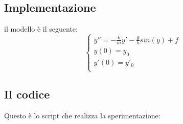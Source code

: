 \documentclass{article}
\begin{document}
	\subsection{Implementazione}
	il modello è il seguente:
	\begin{equation}
	\begin{cases}
	y''=-\frac{k}{m}y'-\frac{g}{h}sin(y)+f \\
	y(0)=y_0 \\
	y'(0)=y'_0 \\
	\end{cases}
	\end{equation}
	\subsection{Il codice}
	Questo è lo script che realizza la sperimentazione:
	
	
\end{document}
